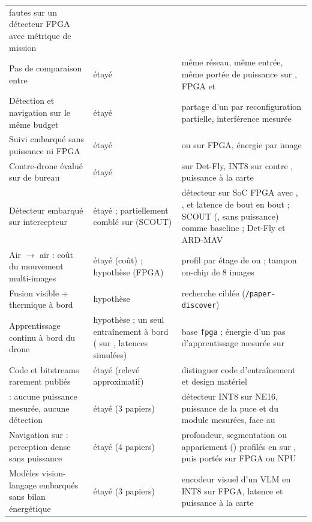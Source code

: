 \begin{table}[!htbp]
\begin{tabularx}{\textwidth}{@{}P{4.3cm}P{1.8cm}L@{}}
  fautes sur un détecteur FPGA avec métrique de mission \\
Pas de comparaison entre  & étayé & même réseau, même entrée, même
  portée de puissance sur , FPGA et  \\
Détection et navigation sur le même budget & étayé & partage d'un  par reconfiguration
  partielle, interférence mesurée \\
Suivi embarqué sans puissance ni FPGA & étayé &  ou  sur FPGA, énergie par
  image \\
Contre-drone évalué sur  de bureau & étayé &  sur Det-Fly, INT8 sur  contre
  , puissance à la carte \\
Détecteur  embarqué sur intercepteur & étayé ; partiellement
  comblé sur  (SCOUT) & détecteur sur SoC FPGA avec , ,  et latence de bout en
  bout ; SCOUT (, sans puissance) comme baseline ; Det-Fly et ARD-MAV \\
Air $\rightarrow$ air : coût du mouvement multi-images & étayé (coût) ; hypothèse (FPGA) &
  profil par étage de  ou  ; tampon on-chip de 8 images \\
Fusion visible + thermique à bord & hypothèse & recherche ciblée (\texttt{/paper-discover}) \\
Apprentissage continu à bord du drone & hypothèse ; un seul entraînement à bord ( sur ,
  latences simulées) & base \texttt{fpga} ; énergie d'un pas d'apprentissage mesurée sur  \\
Code et bitstreams rarement publiés & étayé (relevé approximatif) & distinguer code
  d'entraînement et design matériel \\
 : aucune puissance mesurée, aucune détection & étayé (3 papiers) & détecteur INT8 sur NE16,
  puissance de la puce et du module mesurées, face au  \\
Navigation sur  : perception dense sans puissance & étayé (4 papiers) & profondeur,
  segmentation ou appariement () profilés en  sur , puis portés sur FPGA ou NPU \\
Modèles vision-langage embarqués sans bilan énergétique & étayé (3 papiers) & encodeur visuel
  d'un VLM en INT8 sur FPGA, latence et puissance à la carte \\
\bottomrule
\end{tabularx}
\end{table}

